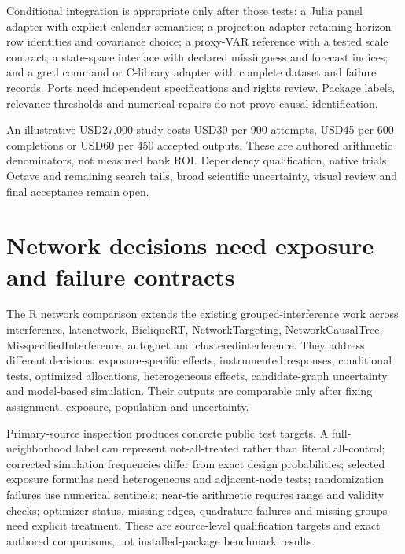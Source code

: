 Conditional integration is appropriate only after those tests: a Julia
panel adapter with explicit calendar semantics; a projection adapter
retaining horizon row identities and covariance choice; a proxy-VAR
reference with a tested scale contract; a state-space interface with
declared missingness and forecast indices; and a gretl command or
C-library adapter with complete dataset and failure records. Ports need
independent specifications and rights review. Package labels, relevance
thresholds and numerical repairs do not prove causal identification.
\citep{exec25_odyn_choice}

An illustrative USD27,000 study costs USD30 per 900 attempts, USD45 per
600 completions or USD60 per 450 accepted outputs. These are authored
arithmetic denominators, not measured bank ROI. Dependency
qualification, native trials, Octave and remaining search tails, broad
scientific uncertainty, visual review and final acceptance remain open.
\citep{exec25_odyn_choice}

\hypertarget{network-decisions-need-exposure-and-failure-contracts}{%
\section{Network decisions need exposure and failure
contracts}\label{network-decisions-need-exposure-and-failure-contracts}}

The R network comparison extends the existing grouped-interference work
across interference, latenetwork, BicliqueRT, NetworkTargeting,
NetworkCausalTree, MisspecifiedInterference, autognet and
clusteredinterference. They address different decisions:
exposure-specific effects, instrumented responses, conditional tests,
optimized allocations, heterogeneous effects, candidate-graph
uncertainty and model-based simulation. Their outputs are comparable
only after fixing assignment, exposure, population and uncertainty.
\citep{exec25_rnet_exposure,exec25_rnet_late,exec25_rnet_biclique,exec25_rnet_target,exec25_rnet_tree,exec25_rnet_nmr,exec25_rnet_auto,exec25_rnet_cluster}

Primary-source inspection produces concrete public test targets. A
full-neighborhood label can represent not-all-treated rather than
literal all-control; corrected simulation frequencies differ from exact
design probabilities; selected exposure formulas need heterogeneous and
adjacent-node tests; randomization failures use numerical sentinels;
near-tie arithmetic requires range and validity checks; optimizer
status, missing edges, quadrature failures and missing groups need
explicit treatment. These are source-level qualification targets and
exact authored comparisons, not installed-package benchmark results.
\citep{exec25_rnet_choice}


